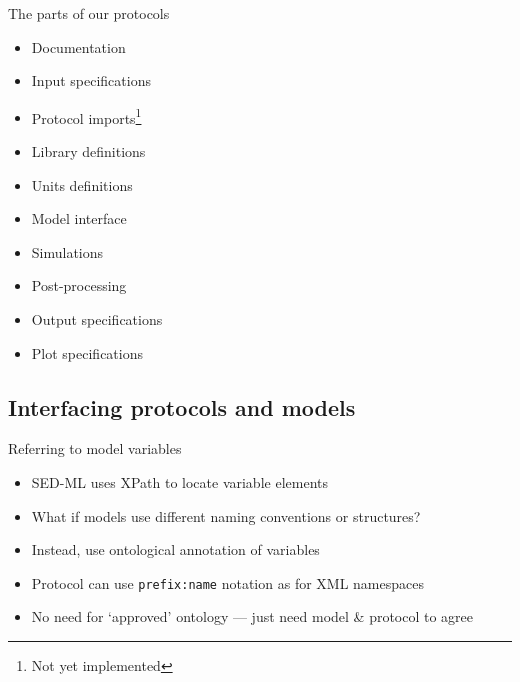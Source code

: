 \documentclass[t,xcolor={usenames,dvipsnames}]{beamer}
\begin{document}
\begin{frame}{The parts of our protocols}
\begin{itemize}
\item Documentation
\item Input specifications
\item Protocol imports\footnote{\tiny Not yet implemented}
\item Library definitions
\item Units definitions
\item<alert@1> Model interface
\item<alert@1> Simulations
\item<alert@1> Post-processing
\item Output specifications
\item Plot specifications
\end{itemize}
\end{frame}

\subsection{Interfacing protocols and models}

\begin{frame}{Referring to model variables}
\begin{itemize}
\item SED-ML uses XPath to locate variable elements
\item What if models use different naming conventions or structures?
\item Instead, use \alert{ontological annotation} of variables
\item Protocol can use \texttt{prefix:name} notation as for XML namespaces
\item No need for `approved' ontology --- just need model \& protocol to agree
\end{itemize}
\end{frame}
\end{document}
